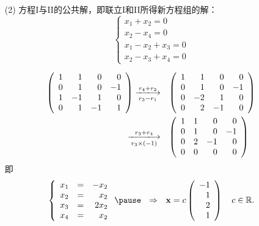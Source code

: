 \begin{frame}
  \begin{footnotesize}
    \begin{itemize}
    \item[(2)] 方程I与II的公共解，即联立I和II所得新方程组的解：
      $$
      \left\{
      \begin{array}{l}
        x_1+x_2=0\\
        x_2-x_4=0\\
        x_1-x_2+x_3=0\\
        x_2-x_3+x_4=0
      \end{array}
      \right.
      $$\pause

      $$
      \begin{array}{rl}
        \left(
        \begin{array}{rrrr}
          1&1&0&0\\
          0&1&0&-1\\
          1&-1&1&0\\
          0&1&-1&1
        \end{array}
        \right) \xlongrightarrow[r_3-r_1]{r_4+r_2} & 
        \left(
        \begin{array}{rrrr}
          1&1&0&0\\
          0&1&0&-1\\
          0&-2&1&0\\
          0&2&-1&0
        \end{array}
        \right) \\[0.3in]
        \xlongrightarrow[r_3\times(-1)]{r_3+r_4}&
        \left(
        \begin{array}{rrrr}
          1&1&0&0\\
          0&1&0&-1\\
          0&2&-1&0\\
          0&0&0&0
        \end{array}
        \right)         
      \end{array}
      $$ \pause 
      即
      $$
      \left\{
      \begin{array}{rcr}
        x_1&=&-x_2\\
        x_2&=&x_2\\
        x_3&=&2x_2\\
        x_4&=&x_2
      \end{array}
      \right. \pause ~~ \Rightarrow ~~
      \xx = c\left(
      \begin{array}{r}
        -1\\1\\2\\1
      \end{array}
      \right) \quad c\in \mathbb R.
      $$
    \end{itemize}
  \end{footnotesize}
\end{frame}

